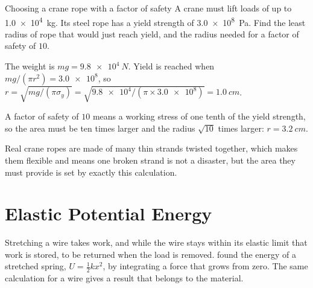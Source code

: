 
\begin{exbox}{Choosing a crane rope with a factor of safety}\label{ex:solids-crane}
A crane must lift loads of up to \SI{1.0e4}{kg}. Its steel rope has a yield strength of
\SI{3.0e8}{Pa}. Find the least radius of rope that would just reach yield, and the radius needed for a
factor of safety of $10$.

 The weight is $mg=\SI{9.8e4}{N}$. Yield is reached when $mg/(\pi r^{2})=\num{3.0e8}$, so
$r=\sqrt{mg/(\pi\sigma_y)}=\sqrt{\num{9.8e4}/(\pi\times\num{3.0e8})}=\SI{1.0}{cm}$.

 A factor of safety of $10$ means a working stress of one tenth of the yield strength, so the
area must be ten times larger and the radius $\sqrt{10}$ times larger: $r=\SI{3.2}{cm}$.

\smallskip
Real crane ropes are made of many thin strands twisted together, which makes them flexible and means one
broken strand is not a disaster, but the area they must provide is set by exactly this calculation.
\end{exbox}

\section{Elastic Potential Energy}\label{sec:solids-energy}

Stretching a wire takes work, and while the wire stays within its elastic limit that work is stored, to
be returned when the load is removed.  found the energy of a stretched spring,
$U=\tfrac12kx^{2}$, by integrating a force that grows from zero. The same calculation for a wire gives a
result that belongs to the material.

